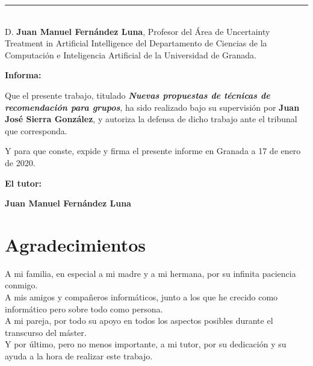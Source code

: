 \noindent\rule[-1ex]{\textwidth}{2pt}\\[4.5ex]

D. \textbf{Juan Manuel Fernández Luna}, Profesor del Área de Uncertainty Treatment in Artificial Intelligence del Departamento de Ciencias de la Computación e Inteligencia Artificial de la Universidad de Granada.

\vspace{0.5cm}

\textbf{Informa:}

\vspace{0.5cm}

Que el presente trabajo, titulado \textit{\textbf{Nuevas propuestas de técnicas de recomendación para grupos}},
ha sido realizado bajo su supervisión por \textbf{Juan José Sierra González}, y autoriza la defensa de dicho trabajo ante el tribunal
que corresponda.

\vspace{0.5cm}

Y para que conste, expide y firma el presente informe en Granada a 17 de enero de 2020.

\vspace{1cm}

\textbf{El tutor:}

\vspace{5cm}

\noindent \textbf{Juan Manuel Fernández Luna}

\chapter*{Agradecimientos}
\thispagestyle{empty}

\vspace{1cm}

A mi familia, en especial a mi madre y a mi hermana, por su infinita paciencia conmigo.\\

A mis amigos y compañeros informáticos, junto a los que he crecido como informático pero sobre todo como persona.\\

A mi pareja, por todo su apoyo en todos los aspectos posibles durante el transcurso del máster.\\

Y por último, pero no menos importante, a mi tutor, por su dedicación y su ayuda a la hora de realizar este trabajo.\\